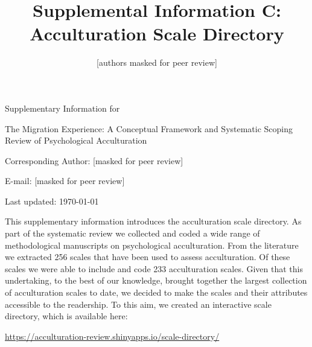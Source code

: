 \documentclass[man, 12pt, a4paper]{apa7}
\title{Supplemental Information C: Acculturation Scale Directory}
\author{[authors masked for peer review]}
\begin{document}
\begin{titlepage}
	{\noindent\Large Supplementary Information for \par}
	\vspace{0.5cm}
	{\noindent\Large The Migration Experience: A Conceptual Framework and Systematic Scoping Review of Psychological Acculturation\par}
	\vspace{1.5cm}
	{\noindent\LARGE\bfseries \thetitle \par}
	\vspace{2cm}
	{\noindent\Large\itshape \theauthor \par}
	\vfill
	\noindent Corresponding Author: [masked for peer review]\par
	\noindent E-mail: [masked for peer review]\par
	\vfill

	{\noindent Last updated: \today\par}
\end{titlepage}

\begin{center}
   \textbf{\thetitle} 
\end{center}

This supplementary information introduces the acculturation scale directory. As part of the systematic review we collected and coded a wide range of methodological manuscripts on psychological acculturation. From the literature we extracted 256 scales that have been used to assess acculturation. Of these scales we were able to include and code 233 acculturation scales. Given that this undertaking, to the best of our knowledge, brought together the largest collection of acculturation scales to date, we decided to make the scales and their attributes accessible to the readership. To this aim, we created an interactive scale directory, which is available here:

\vspace{.5cm}
\begin{tcolorbox}
    \vspace{0.2cm} \centering 
    \href{https://acculturation-review.shinyapps.io/scale-directory/}{https://acculturation-review.shinyapps.io/scale-directory/}
    \vspace{0.2cm} 
\end{tcolorbox}
\end{document}
